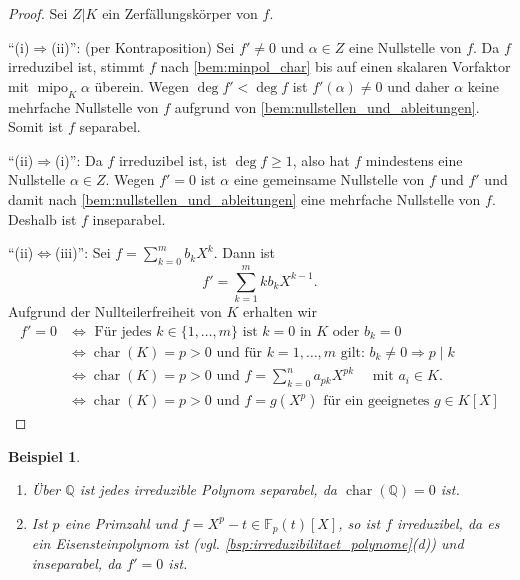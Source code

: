 \documentclass[a4paper, twoside, 11pt, ngerman]{report}
\newcommand{\FF}{\mathds F}
\DeclareMathOperator{\charact}{char}
\DeclareMathOperator{\mipo}{mipo}
\theoremstyle{definistyle}
\newtheorem{bsp}[satz]{Beispiel}
\theoremstyle{remark}
\begin{document}
\begin{proof}
Sei $Z|K$ ein Zerfällungskörper von $f$.

"`(i)$\Rightarrow$(ii)"': (per Kontraposition)  
Sei $f' \neq 0$ und $\alpha \in Z$ eine Nullstelle von $f$. Da $f$ irreduzibel ist, stimmt $f$ nach \ref{bem:minpol_char}
bis auf einen skalaren Vorfaktor mit $\mipo_K\alpha$ überein. Wegen $\deg f'<\deg f$ ist $f'(\alpha)\neq0$
und daher $\alpha$ keine mehrfache Nullstelle von $f$ aufgrund von \ref{bem:nullstellen_und_ableitungen}. Somit ist $f$ separabel.

"`(ii)$\Rightarrow$(i)"':  
Da $f$ irreduzibel ist, ist $\deg f \geq 1$, also hat $f$ mindestens eine Nullstelle $\alpha \in Z$. Wegen $f' = 0$ ist $\alpha$ eine gemeinsame Nullstelle von $f$ und $f'$ und damit nach \ref{bem:nullstellen_und_ableitungen} eine mehrfache Nullstelle von $f$. Deshalb ist $f$ inseparabel.

"`(ii)$\Leftrightarrow$(iii)"':  
Sei $f=\sum_{k=0}^mb_kX^k$. Dann ist
\[
f'=\sum_{k=1}^m kb_kX^{k-1}.
\]
Aufgrund der Nullteilerfreiheit von $K$ erhalten wir
\begin{align*}
f'=0 & \iff \text{ Für jedes }k\in\{1,\ldots,m\}\text{ ist }k=0\text{ in }K\text{ oder }b_k=0\\
& \iff \charact(K)=p>0\text{ und für }k=1,\ldots,m\text{ gilt: }b_k\neq0\Rightarrow p\mid k\\
& \iff \charact(K)=p>0\text{ und }f =\sum_{k=0}^n a_{pk} X^{p k} \quad \text{ mit } a_i \in K.\\
& \iff \charact(K)=p>0\text{ und } f=g(X^p) \text{ für ein geeignetes } g \in K[X]
\end{align*}
\end{proof}

\begin{bsp}\label{bsp:separabilitaet_über_Q}
\begin{enumerate}
\item[(a)] Über $\mathbb{Q}$ ist jedes irreduzible Polynom separabel, da $\charact(\mathbb{Q})=0$ ist.

\item[(b)] Ist $p$ eine Primzahl und $f = X^p - t \in \FF_p(t)[X]$, so ist $f$ irreduzibel, da es ein Eisensteinpolynom ist (vgl. \ref{bsp:irreduzibilitaet_polynome}(d)) und inseparabel, da $f'=0$ ist.
\end{enumerate}
\end{bsp}
\end{document}
